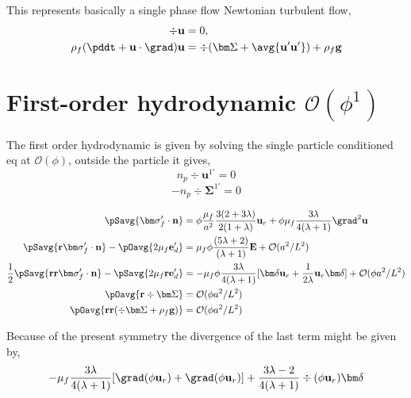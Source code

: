 This represents basically a single phase flow Newtonian turbulent flow, 
\begin{align}
    \div\textbf{u}&=0, \\
    \rho_f (\pddt 
    + \textbf{u}\cdot \grad)
    \textbf{u}
    &= 
    \div( \bm\Sigma
    + \avg{ \textbf{u}'\textbf{u}'} )
    + \rho_f \textbf{g} 
\end{align}


\section{First-order hydrodynamic $\mathcal{O}( \phi^1)$}

The first order hydrodynamic is given by solving the single particle conditioned eq at $\mathcal{O}(\phi)$, outside the particle it gives, 
\begin{equation}
    n_p \div \textbf{u}^{1'} = 0
\end{equation}
\begin{equation*}
    - n_p\div \bm\Sigma^{1'}
   = 
   0
\end{equation*}

\begin{align}
    \pSavg{\bm\sigma_f'\cdot \textbf{n}} 
    &=
    \phi
    \frac{\mu_f}{a^2}
    \frac{3(2+3\lambda)}{2(1+\lambda)}\textbf{u}_r
    + \phi\mu_f  \frac{3\lambda}{4(\lambda +1)} \grad^2 \textbf{u}
    \label{eq:drag_forces}
    \\
    \pSavg{\textbf{r}\bm\sigma_f'\cdot \textbf{n}} - \pOavg{2\mu_f\textbf{e}_d'} 
    &= \mu_f \phi 
    \frac{(5\lambda +2)}{(\lambda +1)}\textbf{E} 
    + \mathcal{O}(a^2/L^2)
    \\
    \frac{1}{2}\pSavg{\textbf{rr}\bm\sigma_f'\cdot \textbf{n}} 
    - \pSavg{ 2\mu_f\textbf{r}\textbf{e}'_d} 
    &=
    - \mu_f \phi \frac{3\lambda}{4(\lambda +1)}[\bm\delta \textbf{u}_r + \frac{1}{2\lambda}\textbf{u}_r \bm\delta ]
    + \mathcal{O}(\phi a^2/L^2)
    \\
    \pOavg{\textbf{r}\div\bm\Sigma} &=
    \mathcal{O}(\phi a^2/L^2)\\
    \pOavg{\textbf{rr}(\div\bm\Sigma+\rho_f \textbf{g})}&=
    \mathcal{O}(\phi a^2/L^2)
    \label{eq:second_moment_surf}
\end{align}

Because of the present symmetry the divergence of the last term might be given by,
\begin{equation}
    - \mu_f \frac{3\lambda}{4(\lambda +1)}[\grad (\phi \textbf{u}_r)+\grad (\phi\textbf{u}_r)] + \frac{3\lambda-2}{4(\lambda+1)}\div (\phi\textbf{u}_r) \bm\delta 
\end{equation} 



